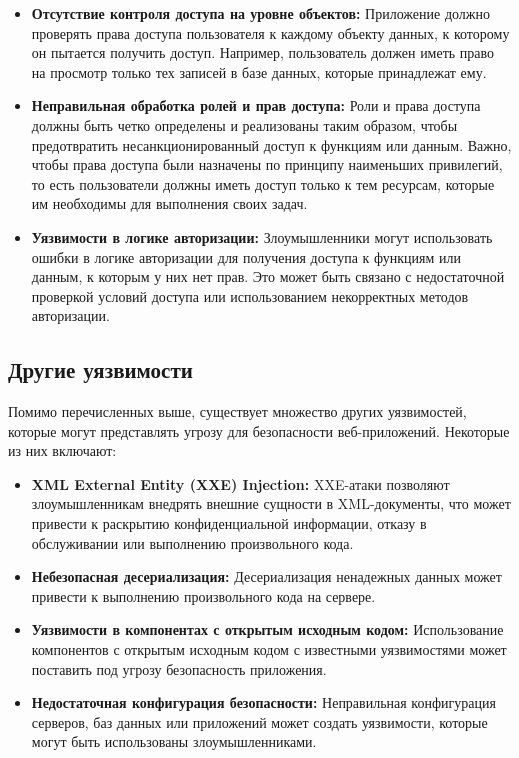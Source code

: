 \documentclass[a4paper,12pt]{diplom}
\begin{document}
	 \begin{itemize}
	 	\item \textbf{Отсутствие контроля доступа на уровне объектов:}  Приложение должно проверять права доступа пользователя к каждому объекту данных, к которому он пытается получить доступ.  Например, пользователь должен иметь право на просмотр только тех записей в базе данных, которые принадлежат ему.
	 	\item \textbf{Неправильная обработка ролей и прав доступа:}  Роли и права доступа должны быть четко определены и реализованы таким образом, чтобы предотвратить несанкционированный доступ к функциям или данным.  Важно, чтобы права доступа были назначены по принципу наименьших привилегий, то есть пользователи должны иметь доступ только к тем ресурсам, которые им необходимы для выполнения своих задач.
	 	\item \textbf{Уязвимости в логике авторизации:}  Злоумышленники могут использовать ошибки в логике авторизации для получения доступа к функциям или данным, к которым у них нет прав.  Это может быть связано с недостаточной проверкой условий доступа или использованием некорректных методов авторизации.
	 \end{itemize}
	 
	 \subsection{Другие уязвимости}
	 
	 Помимо перечисленных выше, существует множество других уязвимостей, которые могут представлять угрозу для безопасности веб-приложений. Некоторые из них включают:
	 
	 \begin{itemize}
	 	\item \textbf{XML External Entity (XXE) Injection:}  XXE-атаки позволяют злоумышленникам внедрять внешние сущности в XML-документы, что может привести к раскрытию конфиденциальной информации, отказу в обслуживании или выполнению произвольного кода. 
	 	\item \textbf{Небезопасная десериализация:}  Десериализация ненадежных данных может привести к выполнению произвольного кода на сервере. 
	 	\item \textbf{Уязвимости в компонентах с открытым исходным кодом:}  Использование компонентов с открытым исходным кодом с известными уязвимостями может поставить под угрозу безопасность приложения. 
	 	\item \textbf{Недостаточная конфигурация безопасности:}  Неправильная конфигурация серверов, баз данных или приложений может создать уязвимости, которые могут быть использованы злоумышленниками. 
	 \end{itemize}
	 
\end{document}

